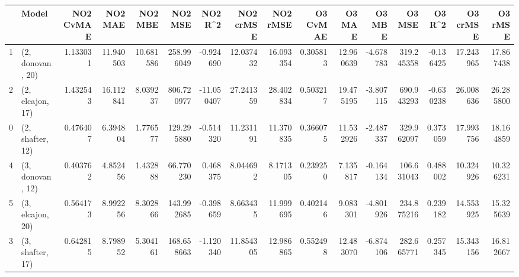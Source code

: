 \begin{tabular}{llrrrrrrrrrrrrrr}
\toprule
{} &             Model &  NO2 CvMAE &    NO2 MAE &    NO2 MBE &     NO2 MSE &    NO2 R\textasciicircum2 &  NO2 crMSE &   NO2 rMSE &  O3 CvMAE &     O3 MAE &    O3 MBE &      O3 MSE &    O3 R\textasciicircum2 &   O3 crMSE &    O3 rMSE \\
\midrule
1 &  (2, donovan, 20) &   1.133031 &  11.940503 &  10.681586 &  258.996049 &  -0.924690 &  12.037432 &  16.093354 &  0.305813 &  12.960639 & -4.678783 &  319.245358 & -0.136425 &  17.243965 &  17.867438 \\
2 &  (2, elcajon, 17) &   1.432543 &  16.112841 &   8.039237 &  806.720977 & -11.050407 &  27.241359 &  28.402834 &  0.503217 &  19.475195 & -3.807115 &  690.943293 & -0.630238 &  26.008636 &  26.285800 \\
0 &  (2, shafter, 12) &   0.476407 &   6.394804 &   1.776577 &  129.295880 &  -0.514320 &  11.231191 &  11.370835 &  0.366075 &  11.532926 & -2.487337 &  329.962097 &  0.373059 &  17.993756 &  18.164859 \\
4 &  (3, donovan, 12) &   0.403762 &   4.852456 &   1.432888 &   66.770230 &   0.468375 &   8.044692 &   8.171305 &  0.239250 &   7.135817 & -0.164134 &  106.631043 &  0.488002 &  10.324926 &  10.326231 \\
5 &  (3, elcajon, 20) &   0.564173 &   8.992256 &   8.302866 &  143.992685 &  -0.398659 &   8.663435 &  11.999695 &  0.402146 &   9.083301 & -4.801926 &  234.875216 &  0.239182 &  14.553925 &  15.325639 \\
3 &  (3, shafter, 17) &   0.642815 &   8.798952 &   5.304161 &  168.658663 &  -1.120340 &  11.854305 &  12.986865 &  0.552498 &  12.483070 & -6.874106 &  282.665771 &  0.257345 &  15.343156 &  16.812667 \\
\bottomrule
\end{tabular}
